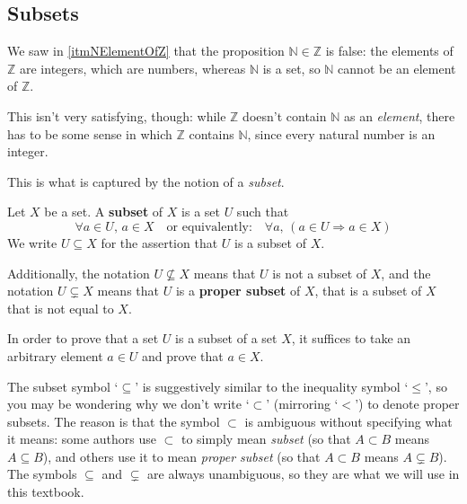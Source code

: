 \subsection*{Subsets}

We saw in \ref{itmNElementOfZ} that the proposition $\mathbb{N} \in \mathbb{Z}$ is false: the elements of $\mathbb{Z}$ are integers, which are numbers, whereas $\mathbb{N}$ is a set, so $\mathbb{N}$ cannot be an element of $\mathbb{Z}$.

This isn't very satisfying, though: while $\mathbb{Z}$ doesn't contain $\mathbb{N}$ as an \textit{element}, there has to be some sense in which $\mathbb{Z}$ contains $\mathbb{N}$, since every natural number is an integer.

This is what is captured by the notion of a \textit{subset}.

\begin{definition}
\label{defSubset}
Let $X$ be a set. A \textbf{subset} of $X$ is a set $U$ such that
\[ \forall a \in U,\, a \in X \quad \text{or equivalently:} \quad \forall a,\, (a \in U \Rightarrow a \in X) \]
We write $U \subseteq X$  for the assertion that $U$ is a subset of $X$.

Additionally, the notation $U \nsubseteq X$  means that $U$ is not a subset of $X$, and the notation $U \subsetneq X$  means that $U$ is a \textbf{proper subset} of $X$, that is a subset of $X$ that is not equal to $X$.
\end{definition}

\begin{strategy}
In order to prove that a set $U$ is a subset of a set $X$, it suffices to take an arbitrary element $a \in U$ and prove that $a \in X$.
\end{strategy}

\begin{aside}
The subset symbol `$\subseteq$' is suggestively similar to the inequality symbol `$\le$', so you may be wondering why we don't write `$\subset$' (mirroring `$<$') to denote proper subsets. The reason is that the symbol $\subset$ is ambiguous without specifying what it means: some authors use $\subset$ to simply mean \textit{subset} (so that $A \subset B$ means $A \subseteq B$), and others use it to mean \textit{proper subset} (so that $A \subset B$ means $A \subsetneq B$). The symbols $\subseteq$ and $\subsetneq$ are always unambiguous, so they are what we will use in this textbook.
\end{aside}

